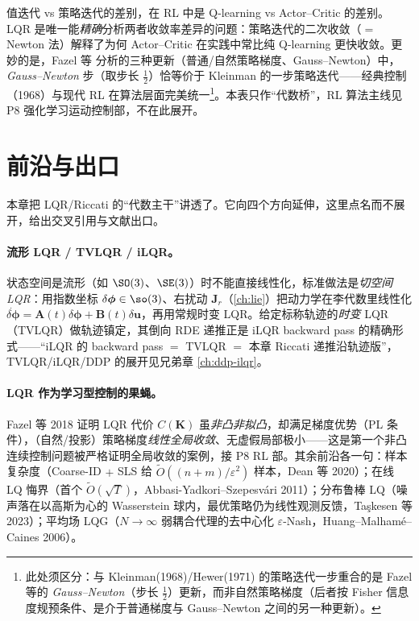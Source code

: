 \begin{insight}
值迭代 vs 策略迭代的差别，在 RL 中是 Q-learning vs Actor--Critic 的差别。LQR 是唯一能\emph{精确}分析两者收敛率差异的问题：策略迭代的二次收敛（$=$ Newton 法）解释了为何 Actor--Critic 在实践中常比纯 Q-learning 更快收敛。更妙的是，Fazel 等\cite{fazel2018global} 分析的三种更新（普通/自然策略梯度、Gauss--Newton）中，\emph{Gauss--Newton} 步（取步长 $\tfrac12$）恰等价于 Kleinman 的一步策略迭代——经典控制（1968）与现代 RL 在算法层面完美统一\footnote{此处须区分：与 Kleinman(1968)/Hewer(1971) 的策略迭代一步重合的是 Fazel 等的 \emph{Gauss--Newton}（步长 $\tfrac12$）更新，而非自然策略梯度（后者按 Fisher 信息度规预条件、是介于普通梯度与 Gauss--Newton 之间的另一种更新）。}。本表只作“代数桥”，RL 算法主线见 P8 强化学习运动控制部，不在此展开。
\end{insight}

\section{前沿与出口}
\label{sec:lqr-frontier}

本章把 LQR/Riccati 的“代数主干”讲透了。它向四个方向延伸，这里点名而不展开，给出交叉引用与文献出口。

\paragraph{流形 LQR / TVLQR / iLQR。}状态空间是流形（如 $\SO(3)$、$\SE(3)$）时不能直接线性化，标准做法是\emph{切空间 LQR}：用指数坐标 $\delta\boldsymbol\phi\in\so(3)$、右扰动 $\mathbf J_r$（\cref{ch:lie}）把动力学在李代数里线性化 $\dot{\delta\boldsymbol\phi}=\mathbf A(t)\delta\boldsymbol\phi+\mathbf B(t)\delta\mathbf u$，再用常规时变 LQR。给定标称轨迹的\emph{时变} LQR（TVLQR）做轨迹镇定，其倒向 RDE 递推正是 iLQR backward pass 的精确形式——“iLQR 的 backward pass $=$ TVLQR $=$ 本章 Riccati 递推沿轨迹版”，TVLQR/iLQR/DDP 的展开见兄弟章 \cref{ch:ddp-ilqr}。

\paragraph{LQR 作为学习型控制的果蝇。}Fazel 等 2018\cite{fazel2018global} 证明 LQR 代价 $C(\mathbf K)$ 虽\emph{非凸非拟凸}，却满足梯度优势（PL 条件），（自然/投影）策略梯度\emph{线性全局收敛}、无虚假局部极小——这是第一个非凸连续控制问题被严格证明全局收敛的案例，接 P8 RL 部。其余前沿各一句：样本复杂度（Coarse-ID $+$ SLS 给 $\tilde O((n+m)/\varepsilon^2)$ 样本，Dean 等 2020\cite{dean2020sample}）；在线 LQ 悔界（首个 $\tilde O(\sqrt T)$，Abbasi-Yadkori--Szepesvári 2011\cite{abbasiyadkori2011regret}）；分布鲁棒 LQ（噪声落在以高斯为心的 Wasserstein 球内，最优策略仍为线性观测反馈，Taşkesen 等 2023\cite{taskesen2023distributionally}）；平均场 LQG（$N\to\infty$ 弱耦合代理的去中心化 $\varepsilon$-Nash，Huang--Malhamé--Caines 2006\cite{huang2006large}）。

